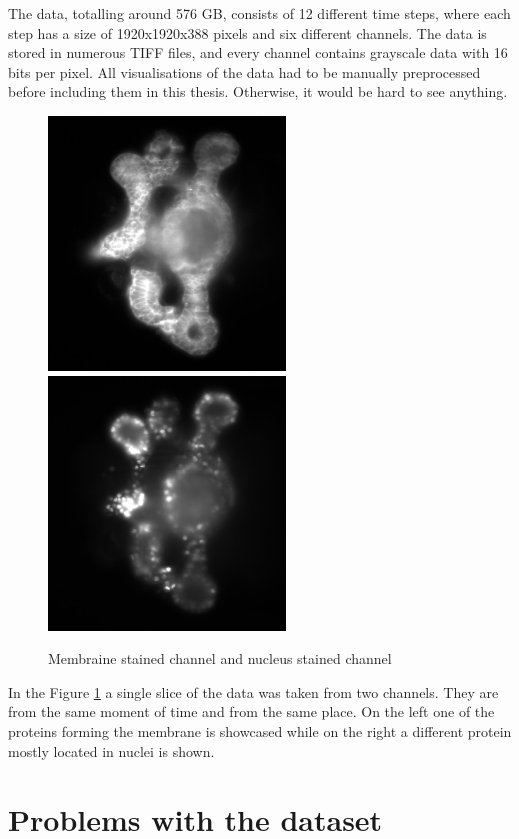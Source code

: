 \documentclass[
  digital,     %
  oneside,     %
  nosansbold,  %
  nocolorbold, %
  lof,         %
  lot,         %
]{fithesis4}
\begin{document}
The data, totalling around 576 GB, consists of 12 different time steps, where
each step has a size of 1920x1920x388 pixels and six different channels. The
data is stored in numerous TIFF files, and every channel contains grayscale data
with 16 bits per pixel. All visualisations of the data had to be manually
preprocessed before including them in this thesis. Otherwise, it would be hard
to see anything.

\begin{figure}
    \begin{center}
        \includegraphics[width=6.3cm]{resources/C3-t006-200-scaled.jpg}
        \includegraphics[width=6.3cm]{resources/C2-t006-200-scaled.jpg}
    \end{center}
    \caption{Membraine stained channel and nucleus stained channel}
    \label{fig:data_example}
\end{figure}
In the Figure \ref{fig:data_example} a single slice of the data was taken from
two channels. They are from the same moment of time and from the same place. On
the left one of the proteins forming the membrane is showcased while on the right a
different protein mostly located in nuclei is shown.

\section{Problems with the dataset}
\end{document}
